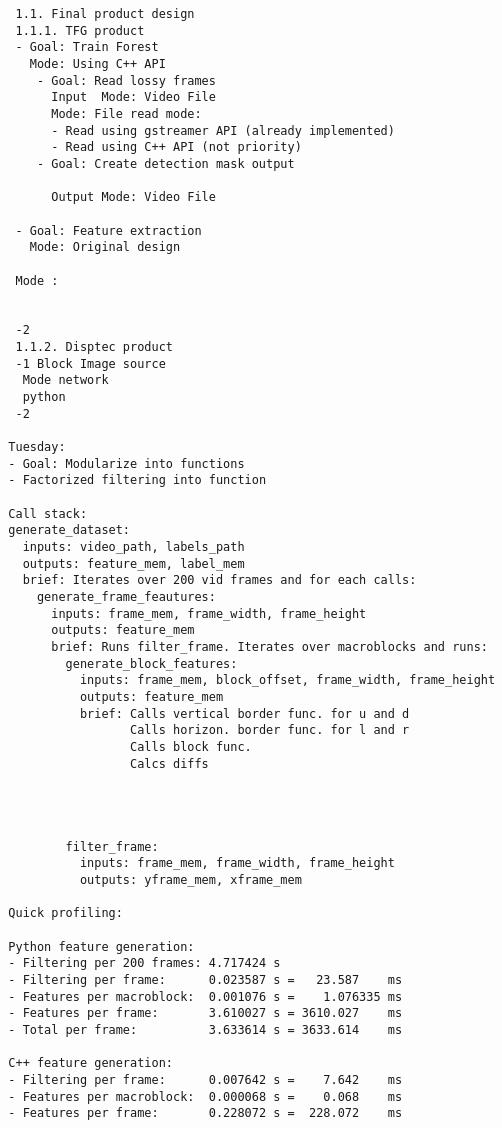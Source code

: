 \documentclass[12pt,oneside]{book}
\begin{document}
\begin{lstlisting}
   1.1. Final product design
   1.1.1. TFG product
   - Goal: Train Forest
     Mode: Using C++ API
      - Goal: Read lossy frames
        Input  Mode: Video File
        Mode: File read mode:
        - Read using gstreamer API (already implemented)
        - Read using C++ API (not priority)
      - Goal: Create detection mask output
      
        Output Mode: Video File

   - Goal: Feature extraction
     Mode: Original design
    
   Mode :


   -2 
   1.1.2. Disptec product
   -1 Block Image source
    Mode network
    python
   -2
  
  Tuesday:
  - Goal: Modularize into functions
  - Factorized filtering into function
  
  Call stack:
  generate_dataset:
    inputs: video_path, labels_path
    outputs: feature_mem, label_mem
    brief: Iterates over 200 vid frames and for each calls:
      generate_frame_feautures:
        inputs: frame_mem, frame_width, frame_height
        outputs: feature_mem
        brief: Runs filter_frame. Iterates over macroblocks and runs:
          generate_block_features:
            inputs: frame_mem, block_offset, frame_width, frame_height
            outputs: feature_mem
            brief: Calls vertical border func. for u and d
                   Calls horizon. border func. for l and r
                   Calls block func.
                   Calcs diffs
          



          filter_frame:
            inputs: frame_mem, frame_width, frame_height
            outputs: yframe_mem, xframe_mem
        
  Quick profiling:
  
  Python feature generation:
  - Filtering per 200 frames: 4.717424 s
  - Filtering per frame:      0.023587 s =   23.587    ms
  - Features per macroblock:  0.001076 s =    1.076335 ms
  - Features per frame:       3.610027 s = 3610.027    ms
  - Total per frame:          3.633614 s = 3633.614    ms

  C++ feature generation:
  - Filtering per frame:      0.007642 s =    7.642    ms
  - Features per macroblock:  0.000068 s =    0.068    ms 
  - Features per frame:       0.228072 s =  228.072    ms


\end{lstlisting}



  \printbibliography[title={Bibliografía},heading=bibintoc]
\end{document}

